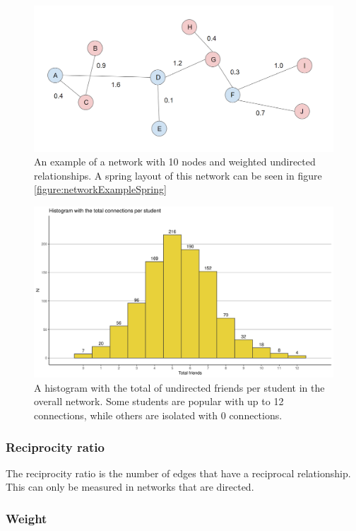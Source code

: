     \begin{figure}[ht]
        \centering
            \includegraphics[width=0.7\linewidth]{figures/Networks/Concepts/edgesValues.png} 
        \caption{An example of a network with 10 nodes and weighted undirected relationships. A spring layout of this network can be seen in figure \ref{figure:networkExampleSpring}}
        \label{figure:networkExampleWeights}
    \end{figure}


    \begin{figure}[ht]
        \centering
            \includegraphics[width=0.7\linewidth]{figures/Networks/Histograms/Histogram_completeTable_OverallConnections.png} 
        \caption{A histogram with the total of undirected friends per student in the overall network. Some students are popular with up to 12 connections, while others are isolated with 0 connections.}
        \label{figure:networksHistogramFriendship}
    \end{figure}  

\subsubsection{Reciprocity ratio}

The reciprocity ratio is the number of edges that have a reciprocal relationship. This can only be measured in networks that are directed.

\subsubsection{Weight}


